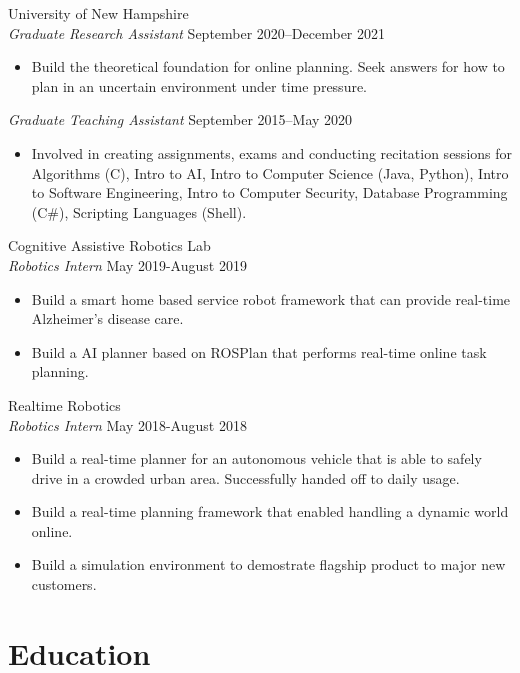 \documentclass[margin, 10pt]{res} %
\begin{document}
\begin{resume}
{\sc University of New Hampshire}\\
{\sl Graduate Research Assistant} \hfill September 2020--December 2021
\begin{itemize}
\item Build the theoretical foundation for online planning. Seek answers for how to plan in an uncertain environment under time pressure.
\end{itemize}
{\sl Graduate Teaching Assistant} \hfill September 2015--May 2020
\begin{itemize}
\item Involved in creating assignments, exams and
		conducting recitation sessions for Algorithms (C), Intro to AI, Intro to
            Computer Science (Java, Python), Intro to Software Engineering, Intro to
		Computer Security, Database Programming (C\#), Scripting Languages (Shell).
\end{itemize}


{\sc Cognitive Assistive Robotics Lab}\\
{\sl Robotics Intern} \hfill May 2019-August 2019
\begin{itemize}
	\item Build a smart home based service robot framework that
					can provide real-time Alzheimer's disease care.
	\item Build a AI planner based on ROSPlan that performs
					real-time online task planning.
\end{itemize}

{\sc Realtime Robotics}\\
{\sl Robotics Intern} \hfill May 2018-August 2018
\begin{itemize}
\item Build a real-time planner for an autonomous vehicle that is
		able to safely drive in a crowded urban area. Successfully 
		handed off to daily usage.
\item Build a real-time planning framework that enabled handling a 
		dynamic world online.
\item Build a simulation environment to demostrate flagship product
		to major new customers.
\end{itemize}

\section{Education}


\end{resume}
\end{document}
